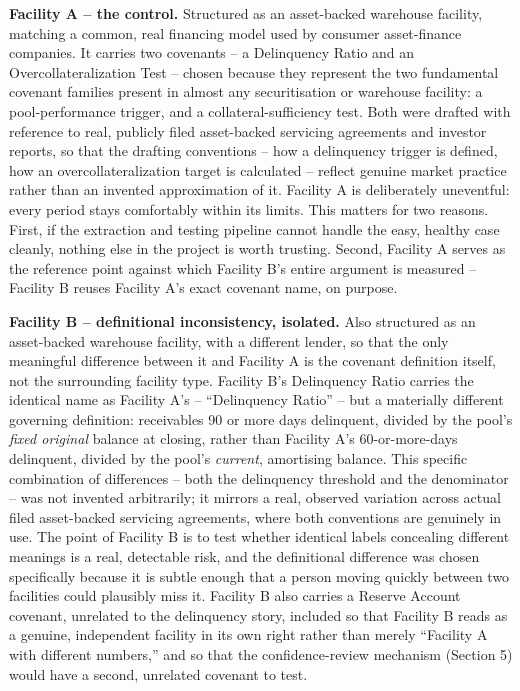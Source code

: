 \documentclass[11pt,a4paper]{article}
\begin{document}
\textbf{Facility A -- the control.} Structured as an asset-backed warehouse facility, matching a common, real financing model used by consumer asset-finance companies. It carries two covenants -- a Delinquency Ratio and an Overcollateralization Test -- chosen because they represent the two fundamental covenant families present in almost any securitisation or warehouse facility: a pool-performance trigger, and a collateral-sufficiency test. Both were drafted with reference to real, publicly filed asset-backed servicing agreements and investor reports, so that the drafting conventions -- how a delinquency trigger is defined, how an overcollateralization target is calculated -- reflect genuine market practice rather than an invented approximation of it. Facility A is deliberately uneventful: every period stays comfortably within its limits. This matters for two reasons. First, if the extraction and testing pipeline cannot handle the easy, healthy case cleanly, nothing else in the project is worth trusting. Second, Facility A serves as the reference point against which Facility B's entire argument is measured -- Facility B reuses Facility A's exact covenant name, on purpose.

\textbf{Facility B -- definitional inconsistency, isolated.} Also structured as an asset-backed warehouse facility, with a different lender, so that the only meaningful difference between it and Facility A is the covenant definition itself, not the surrounding facility type. Facility B's Delinquency Ratio carries the identical name as Facility A's -- ``Delinquency Ratio'' -- but a materially different governing definition: receivables 90 or more days delinquent, divided by the pool's \emph{fixed original} balance at closing, rather than Facility A's 60-or-more-days delinquent, divided by the pool's \emph{current}, amortising balance. This specific combination of differences -- both the delinquency threshold and the denominator -- was not invented arbitrarily; it mirrors a real, observed variation across actual filed asset-backed servicing agreements, where both conventions are genuinely in use. The point of Facility B is to test whether identical labels concealing different meanings is a real, detectable risk, and the definitional difference was chosen specifically because it is subtle enough that a person moving quickly between two facilities could plausibly miss it. Facility B also carries a Reserve Account covenant, unrelated to the delinquency story, included so that Facility B reads as a genuine, independent facility in its own right rather than merely ``Facility A with different numbers,'' and so that the confidence-review mechanism (Section 5) would have a second, unrelated covenant to test.
\end{document}
